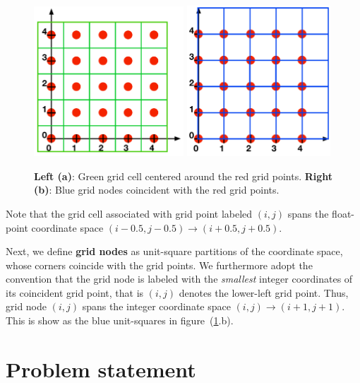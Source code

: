 \documentclass[12pt, letterpaper]{article}
\begin{document}
\begin{figure}[ht]
\begin{center}
\includegraphics[width=0.50\textwidth]{GridCells.pdf}
\includegraphics[width=0.48\textwidth]{GridNodes.pdf}
\caption{{\bf Left (a)}: Green grid cell centered around the red grid points. {\bf Right (b)}: Blue grid nodes coincident with the red grid points.}
\label{fig:CellsNodes}
\end{center}
\end{figure}

Note that the grid cell associated with grid point labeled $(i,j)$ spans the float-point coordinate space $(i-0.5,j-0.5)\rightarrow(i+0.5,j+0.5)$.

Next, we define {\bf grid nodes} as unit-square partitions of the coordinate space, whose corners coincide with the grid points. We furthermore adopt the convention that the grid node is labeled with the \emph{smallest} integer coordinates of its coincident grid point, that is $(i,j)$ denotes the lower-left grid point. Thus, grid node $(i,j)$ spans the integer coordinate space $(i,j)\rightarrow(i+1,j+1)$. This is show as the blue unit-squares in figure~(\ref{fig:CellsNodes}.b).

\section{Problem statement}
\end{document}
